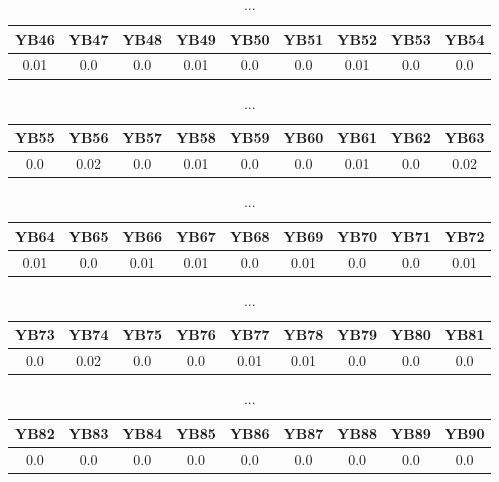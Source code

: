 \documentclass[]{article}
\begin{document}
\begin{table}[h]
      \centering
      \begin{tabular}{|c|c|c|c|c|c|c|c|c|}
            \hline
            YB46 & YB47 & YB48 & YB49 & YB50 & YB51 & YB52 & YB53 & YB54 \\
            \hline
            0.01 & 0.0  & 0.0  & 0.01 & 0.0  & 0.0  & 0.01 & 0.0  & 0.0  \\
            \hline
      \end{tabular}
      \caption{...}
\end{table}
\begin{table}[h]
      \centering
      \begin{tabular}{|c|c|c|c|c|c|c|c|c|}
            \hline
            YB55 & YB56 & YB57 & YB58 & YB59 & YB60 & YB61 & YB62 & YB63 \\
            \hline
            0.0  & 0.02 & 0.0  & 0.01 & 0.0  & 0.0  & 0.01 & 0.0  & 0.02 \\
            \hline
      \end{tabular}
      \caption{...}
\end{table}
\begin{table}[h]
      \centering
      \begin{tabular}{|c|c|c|c|c|c|c|c|c|}
            \hline
            YB64 & YB65 & YB66 & YB67 & YB68 & YB69 & YB70 & YB71 & YB72 \\
            \hline
            0.01 & 0.0  & 0.01 & 0.01 & 0.0  & 0.01 & 0.0  & 0.0  & 0.01 \\
            \hline
      \end{tabular}
      \caption{...}
\end{table}
\begin{table}[h]
      \centering
      \begin{tabular}{|c|c|c|c|c|c|c|c|c|}
            \hline
            YB73 & YB74 & YB75 & YB76 & YB77 & YB78 & YB79 & YB80 & YB81 \\
            \hline
            0.0  & 0.02 & 0.0  & 0.0  & 0.01 & 0.01 & 0.0  & 0.0  & 0.0  \\
            \hline
      \end{tabular}
      \caption{...}
\end{table}
\begin{table}[h]
      \centering
      \begin{tabular}{|c|c|c|c|c|c|c|c|c|}
            \hline
            YB82 & YB83 & YB84 & YB85 & YB86 & YB87 & YB88 & YB89 & YB90 \\
            \hline
            0.0  & 0.0  & 0.0  & 0.0  & 0.0  & 0.0  & 0.0  & 0.0  & 0.0  \\
            \hline
      \end{tabular}
      \caption{...}
\end{table}
\end{document}
